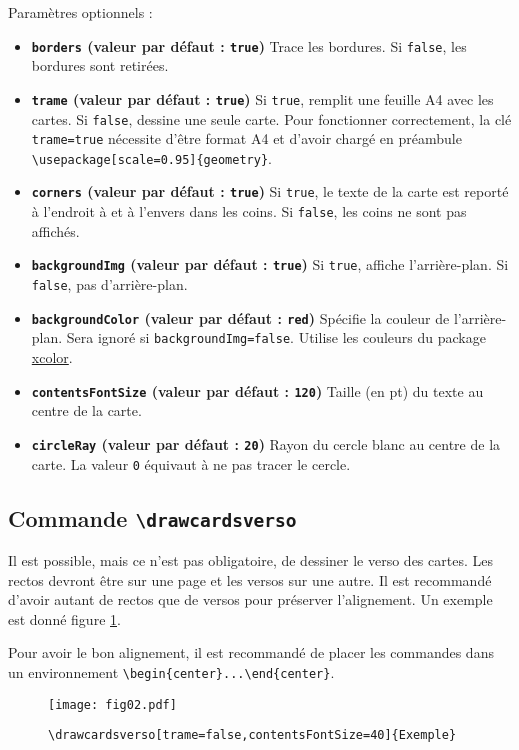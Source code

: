 \documentclass[a4paper, 12pt]{article}
\newcommand{\key}[3]{\textbf{\texttt{#1} (valeur par défaut : \texttt{#2})} #3}
\newcommand{\commande}[1]{\texttt{\textbackslash#1}}
\begin{document}
Paramètres optionnels :
\begin{itemize}
	\item \key{borders}{true}{Trace les bordures. Si \texttt{false}, les bordures sont retirées.}
	\item \key{trame}{true}{Si \texttt{true}, remplit une feuille A4 avec les cartes. Si \texttt{false}, dessine une seule carte. Pour fonctionner correctement, la clé \texttt{trame=true} nécessite d'être format A4 et d'avoir chargé en préambule \commande{usepackage[scale=0.95]\{geometry\}}}.
	\item \key{corners}{true}{Si \texttt{true}, le texte de la carte est reporté à l'endroit à et à l'envers dans les coins. Si \texttt{false}, les coins ne sont pas affichés.}
	\item \key{backgroundImg}{true}{Si \texttt{true}, affiche l'arrière-plan. Si \texttt{false}, pas d'arrière-plan.}
	\item \key{backgroundColor}{red}{Spécifie la couleur de l'arrière-plan. Sera ignoré si \texttt{backgroundImg=false}. Utilise les couleurs du package \href{https://www.ctan.org/pkg/xcolor}{xcolor}.}
	\item \key{contentsFontSize}{120}{Taille (en pt) du texte au centre de la carte.}
	\item \key{circleRay}{20}{Rayon du cercle blanc au centre de la carte. La valeur \texttt 0 équivaut à ne pas tracer le cercle.}
\end{itemize}

	\subsection{Commande \commande{drawcardsverso}}
Il est possible, mais ce n'est pas obligatoire, de dessiner le verso des cartes. Les rectos devront être sur une page et les versos sur une autre. Il est recommandé d'avoir autant de rectos que de versos pour préserver l'alignement. Un exemple est donné figure \ref{fig:verso}.

Pour avoir le bon alignement, il est recommandé de placer les commandes dans un environnement \verb!\begin{center}...\end{center}!.
\begin{figure}[h]\begin{center}
	\caption{\commande{drawcardsverso[trame=false,contentsFontSize=40]\{Exemple\}}}
	\texttt{[image: fig02.pdf]}\label{fig:verso}
\end{center}\end{figure}
\end{document}
